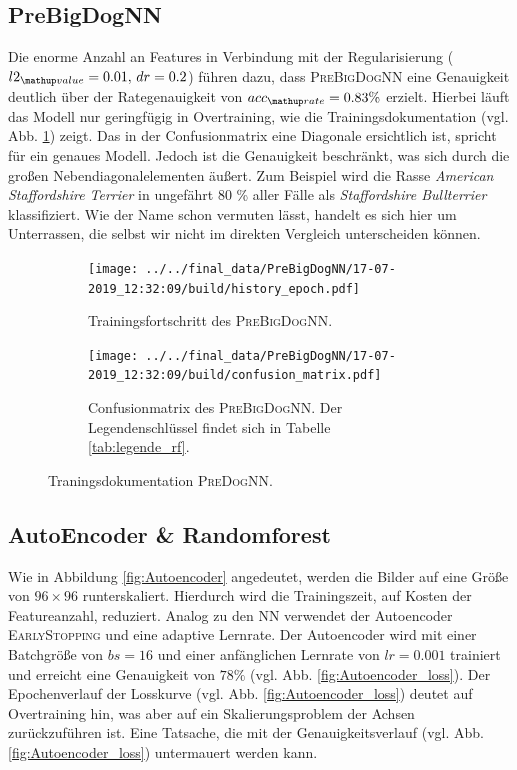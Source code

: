 \subsection{PreBigDogNN}
Die enorme Anzahl an Features in Verbindung mit der Regularisierung ($l2\ua{value}=0.01, \, dr=0.2$)
führen dazu, dass \textsc{PreBigDogNN} eine Genauigkeit deutlich über der Rategenauigkeit
von $acc\ua{rate}=0.83\%$ erzielt. Hierbei läuft das Modell nur geringfügig in Overtraining,
wie die Trainingsdokumentation (vgl. Abb. \ref{fig:PreBigDogNN_Loss_Acc}) zeigt.
Das in der Confusionmatrix eine Diagonale ersichtlich ist, spricht für ein genaues Modell.
Jedoch ist die Genauigkeit beschränkt, was sich durch die großen Nebendiagonalelementen
äußert. Zum Beispiel wird die Rasse \emph{American Staffordshire Terrier}
in ungefährt 80 \% aller Fälle als \emph{Staffordshire Bullterrier} klassifiziert.
Wie der Name schon vermuten lässt, handelt es sich hier um Unterrassen, die
selbst wir nicht im direkten Vergleich unterscheiden können.
\begin{figure}
\centering
\begin{subfigure}{0.48\textwidth}
\centering
\texttt{[image: ../../final\_data/PreBigDogNN/17-07-2019\_12:32:09/build/history\_epoch.pdf]}
\caption{Trainingsfortschritt des \textsc{PreBigDogNN}.}
\label{fig:PreBigDogNN_Loss_Acc}
\end{subfigure}
\begin{subfigure}{0.48\textwidth}
\centering
\texttt{[image: ../../final\_data/PreBigDogNN/17-07-2019\_12:32:09/build/confusion\_matrix.pdf]}
\caption{Confusionmatrix des \textsc{PreBigDogNN}. Der Legendenschlüssel findet sich in
Tabelle \ref{tab:legende_rf}.}
\label{fig:PreBigDogNN_Confusionmatrix}
\end{subfigure}
\caption{Traningsdokumentation \textsc{PreDogNN}.}
\end{figure}
\subsection{AutoEncoder \& Randomforest}
Wie in Abbildung \ref{fig:Autoencoder} angedeutet, werden die Bilder auf eine Größe von $96\times96$ runterskaliert.
Hierdurch wird die Trainingszeit, auf Kosten der Featureanzahl,
reduziert. Analog zu den NN verwendet der Autoencoder \textsc{EarlyStopping}
und eine adaptive Lernrate. Der Autoencoder wird mit einer Batchgröße
von $bs=16$ und einer anfänglichen Lernrate von $lr=0.001$ trainiert und
erreicht eine Genauigkeit von $78\%$ (vgl. Abb. \ref{fig:Autoencoder_loss}).
Der Epochenverlauf der Losskurve (vgl. Abb. \ref{fig:Autoencoder_loss}) deutet auf Overtraining hin, was aber auf ein Skalierungsproblem der Achsen zurückzuführen ist.
Eine Tatsache, die mit der Genauigkeitsverlauf (vgl. Abb. \ref{fig:Autoencoder_loss}) untermauert werden kann.


